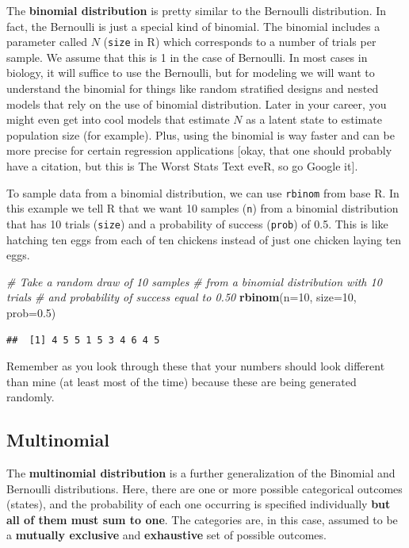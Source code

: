 \documentclass[
]{book}
\newenvironment{Shaded}{\begin{snugshade}}{\end{snugshade}}
\newcommand{\CommentTok}[1]{\textcolor[rgb]{0.56,0.35,0.01}{\textit{#1}}}
\newcommand{\DataTypeTok}[1]{\textcolor[rgb]{0.13,0.29,0.53}{#1}}
\newcommand{\DecValTok}[1]{\textcolor[rgb]{0.00,0.00,0.81}{#1}}
\newcommand{\FloatTok}[1]{\textcolor[rgb]{0.00,0.00,0.81}{#1}}
\newcommand{\KeywordTok}[1]{\textcolor[rgb]{0.13,0.29,0.53}{\textbf{#1}}}
\newcommand{\NormalTok}[1]{#1}
\begin{document}
The \textbf{binomial distribution} is pretty similar to the Bernoulli distribution. In fact, the Bernoulli is just a special kind of binomial. The binomial includes a parameter called \(N\) (\texttt{size} in R) which corresponds to a number of trials per sample. We assume that this is 1 in the case of Bernoulli. In most cases in biology, it will suffice to use the Bernoulli, but for modeling we will want to understand the binomial for things like random stratified designs and nested models that rely on the use of binomial distribution. Later in your career, you might even get into cool models that estimate \(N\) as a latent state to estimate population size (for example). Plus, using the binomial is way faster and can be more precise for certain regression applications {[}okay, that one should probably have a citation, but this is The Worst Stats Text eveR, so go Google it{]}.

To sample data from a binomial distribution, we can use \texttt{rbinom} from base R. In this example we tell R that we want 10 samples (\texttt{n}) from a binomial distribution that has 10 trials (\texttt{size}) and a probability of success (\texttt{prob}) of 0.5. This is like hatching ten eggs from each of ten chickens instead of just one chicken laying ten eggs.

\begin{Shaded}
\begin{Highlighting}[]
\CommentTok{# Take a random draw of 10 samples}
\CommentTok{# from a binomial distribution with 10 trials}
\CommentTok{# and probability of success equal to 0.50}
\KeywordTok{rbinom}\NormalTok{(}\DataTypeTok{n=}\DecValTok{10}\NormalTok{, }\DataTypeTok{size=}\DecValTok{10}\NormalTok{, }\DataTypeTok{prob=}\FloatTok{0.5}\NormalTok{)}
\end{Highlighting}
\end{Shaded}

\begin{verbatim}
##  [1] 4 5 5 1 5 3 4 6 4 5
\end{verbatim}

Remember as you look through these that your numbers should look different than mine (at least most of the time) because these are being generated randomly.

\hypertarget{multinomial}{%
\subsection{Multinomial}\label{multinomial}}

The \textbf{multinomial distribution} is a further generalization of the Binomial and Bernoulli distributions. Here, there are one or more possible categorical outcomes (states), and the probability of each one occurring is specified individually \textbf{but all of them must sum to one}. The categories are, in this case, assumed to be a \textbf{mutually exclusive} and \textbf{exhaustive} set of possible outcomes.
\end{document}
